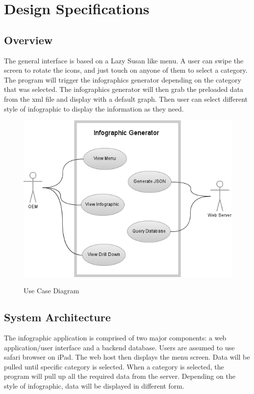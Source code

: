 \documentclass[11pt,a4paper,oneside]{article}
\begin{document}
\section{Design Specifications}

\subsection{Overview}

The general interface is based on a Lazy Susan like menu. A user can swipe the screen to rotate the icons, and just touch on anyone of them to select a category. The program will trigger the infographics generator depending on the category that was selected. The infographics generator will then grab the preloaded data from the xml file and display with a default graph. Then user can select different style of infographic to display the information as they need.\\

\begin{figure}[!]
\caption{Use Case Diagram}
\includegraphics[width=1\textwidth]{images/Capstone_-_Use_Case_Diagram.png}\\   
\end{figure}


\subsection{System Architecture}

The infographic application is comprised of two major components: a web application/user interface and a backend database. Users are assumed to use safari browser on iPad. The web host then displays the menu screen. Data will be pulled until specific category is selected. When a category is selected, the program will pull up all the required data from the server. Depending on the style of infographic, data will be displayed in different form.\\
\end{document}
